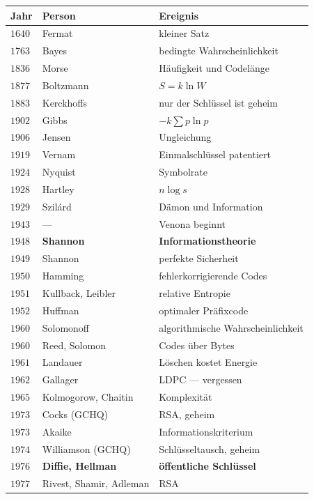 \begin{merksatz}
\begin{center}
{\small
\renewcommand{\arraystretch}{1.34}
\begin{tabular}{@{}P{1.4cm}P{2.8cm}P{4.0cm}@{}}
\toprule
\textbf{Jahr} & \textbf{Person} & \textbf{Ereignis}\\
\midrule
$1640$ & Fermat & kleiner Satz\\
$1763$ & Bayes & bedingte Wahrscheinlichkeit\\
$1836$ & Morse & Häufigkeit und Codelänge\\
$1877$ & Boltzmann & $S = k\ln W$\\
$1883$ & Kerckhoffs & nur der Schlüssel ist geheim\\
$1902$ & Gibbs & $-k\sum p\ln p$\\
$1906$ & Jensen & Ungleichung\\
$1919$ & Vernam & Einmalschlüssel patentiert\\
$1924$ & Nyquist & Symbolrate\\
$1928$ & Hartley & $n\log s$\\
$1929$ & Szilárd & Dämon und Information\\
$1943$ & --- & Venona beginnt\\
$1948$ & \textbf{Shannon} & \textbf{Informationstheorie}\\
$1949$ & Shannon & perfekte Sicherheit\\
$1950$ & Hamming & fehlerkorrigierende Codes\\
$1951$ & Kullback, Leibler & relative Entropie\\
$1952$ & Huffman & optimaler Präfixcode\\
$1960$ & Solomonoff & algorithmische Wahrscheinlichkeit\\
$1960$ & Reed, Solomon & Codes über Bytes\\
$1961$ & Landauer & Löschen kostet Energie\\
$1962$ & Gallager & LDPC --- vergessen\\
$1965$ & Kolmogorow, Chaitin & Komplexität\\
$1973$ & Cocks (GCHQ) & RSA, geheim\\
$1973$ & Akaike & Informationskriterium\\
$1974$ & Williamson (GCHQ) & Schlüsseltausch, geheim\\
$1976$ & \textbf{Diffie, Hellman} & \textbf{öffentliche Schlüssel}\\
$1977$ & Rivest, Shamir, Adleman & RSA\\

\end{tabular}}
\end{center}
\end{merksatz}
